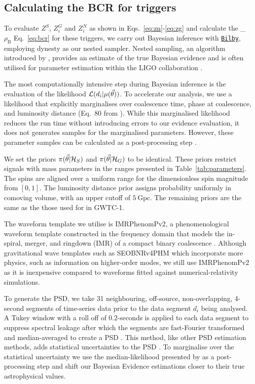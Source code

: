 \documentclass[%
 amsmath,amssymb,
 aps,
twocolumn
]{revtex4}
\newcommand{\bilby}{{\sc \href{https://lscsoft.docs.ligo.org/bilby/}{\texttt{Bilby}}}\xspace}
\newcommand{\dynesty}{{\sc dynesty}\xspace}
\newcommand{\imrphenomp}{{\sc IMRPhenomPv2}\xspace}
\newcommand{\seob}{{\sc SEOBNRv4PHM}\xspace}
\newcommand{\mathcmd}[1]{{\sc \relax\ifmmode#1\else $#1$\fi}\xspace}
\newcommand{\bcr}{\mathcmd{\rho_\text{B}}}
\newcommand{\parameters}{\mathcmd{\vec{\theta}}}
\newcommand{\template}{\mathcmd{\mu(\parameters)}}
\begin{document}
\subsection{Calculating the BCR for triggers}
To evaluate $Z^S$, $Z^G_i$ and $Z^N_i$ as shown in Eqs.~\ref{eq:zn}-\ref{eq:zg} and calculate the \bcr Eq.~\ref{eq:bcr} for these triggers, we carry out Bayesian inference with \bilby \cite{bilby}, employing \dynesty \cite{dynesty} as our nested sampler. Nested sampling, an algorithm introduced by \cite{skilling_nested_sampling}, provides an estimate of the true Bayesian evidence and is often utilised for parameter estimation within the LIGO collaboration \cite{bilby}.

The most computationally intensive step during Bayesian inference is the evaluation of the likelihood $\mathcal{L}(d_i|\template)$. To accelerate our analysis, we use a likelihood that explicitly marginalises over coalescence time, phase at coalescence, and luminosity distance (Eq.~80 from \citet{intro_to_gw_bayes}). While this marginalised likelihood reduces the run time without introducing errors to our evidence evaluation, it does not generates samples for the marginalised parameters. However, these parameter samples can be calculated as a post-processing step \cite{intro_to_gw_bayes}.

We set the priors $\pi(\parameters|\mathcal{H}_S)$ and $\pi(\parameters|\mathcal{H}_G)$ to be identical. These priors restrict signals with mass parameters in the ranges presented in Table~\ref{tab:parameters}. The spins are aligned over a uniform range for the dimensionless spin magnitude from $\left[0,1\right]$. The luminosity distance prior assigns probability uniformly in comoving volume, with an upper cutoff of $5\ \text{Gpc}$. The remaining priors are the same as the those used for in GWTC-1. 

The waveform template we utilise is \imrphenomp, a phenomenological waveform template constructed in the frequency domain that models the in-spiral, merger, and ringdown (IMR) of a compact binary coalescence \citep{khan2016frequency}. Although gravitational wave templates such as \seob \cite{seob} which incorporate more physics, such as information on higher-order modes, we still use \imrphenomp as it is inexpensive compared to waveforms fitted
against numerical-relativity simulations.

To generate the PSD, we take 31 neighbouring, off-source, non-overlapping,  4-second  segments of time-series data prior to the data segment $d_i$ being analysed. A Tukey window with a roll off of 0.2-seconds is applied to each data segment to suppress spectral leakage after which the segments are fast-Fourier transformed and median-averaged to create a PSD \cite{ligo_psd}. This method, like other PSD estimation methods, adds statistical uncertainties to the PSD \cite{psd_student_t}. To marginalise over the statistical uncertainty we use the median-likelihood presented by \citet{psd_student_t} as a post-processing step and shift our Bayesian Evidence estimations closer to their true astrophysical values. 
\end{document}

